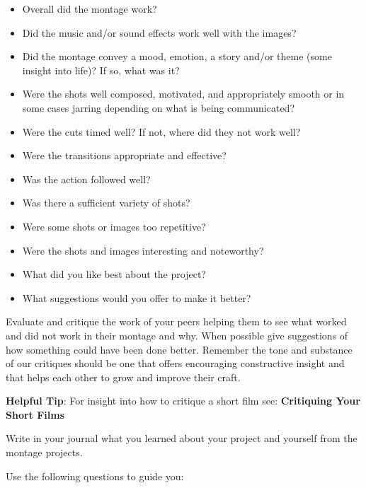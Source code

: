 \documentclass[
]{book}
\providecommand{\tightlist}{%
  \setlength{\itemsep}{0pt}\setlength{\parskip}{0pt}}
\begin{document}
\begin{reflect}
\begin{itemize}
\tightlist
\item
  Overall did the montage work?\\
\item
  Did the music and/or sound effects work well with the images?\\
\item
  Did the montage convey a mood, emotion, a story and/or theme (some insight into life)? If so, what was it?\\
\item
  Were the shots well composed, motivated, and appropriately smooth or in some cases jarring depending on what is being communicated?\\
\item
  Were the cuts timed well? If not, where did they not work well?\\
\item
  Were the transitions appropriate and effective?\\
\item
  Was the action followed well?\\
\item
  Was there a sufficient variety of shots?\\
\item
  Were some shots or images too repetitive?\\
\item
  Were the shots and images interesting and noteworthy?\\
\item
  What did you like best about the project?\\
\item
  What suggestions would you offer to make it better?
\end{itemize}

Evaluate and critique the work of your peers helping them to see what worked and did not work in their montage and why. When possible give suggestions of how something could have been done better. Remember the tone and substance of our critiques should be one that offers encouraging constructive insight and that helps each other to grow and improve their craft.

\textbf{Helpful Tip}: For insight into how to critique a short film see: \textbf{Critiquing Your Short Films}

Write in your journal what you learned about your project and yourself from the montage projects.

Use the following questions to guide you:


\end{reflect}
\end{document}
